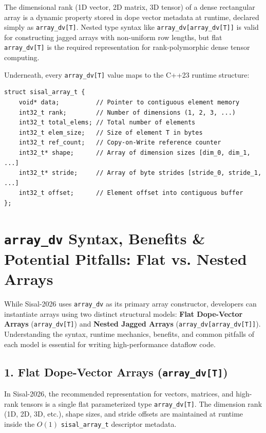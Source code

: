 \begin{note}
The dimensional rank (1D vector, 2D matrix, 3D tensor) of a dense rectangular array is a dynamic property stored in dope vector metadata at runtime, declared simply as \texttt{array\_dv[T]}. Nested type syntax like \texttt{array\_dv[array\_dv[T]]} is valid for constructing jagged arrays with non-uniform row lengths, but flat \texttt{array\_dv[T]} is the required representation for rank-polymorphic dense tensor computing.
\end{note}

Underneath, every \texttt{array\_dv[T]} value maps to the C++23 runtime structure:
\begin{lstlisting}[caption={\texttt{sisal\_array\_t} Dope Vector Structure}]
struct sisal_array_t {
    void* data;          // Pointer to contiguous element memory
    int32_t rank;        // Number of dimensions (1, 2, 3, ...)
    int32_t total_elems; // Total number of elements
    int32_t elem_size;   // Size of element T in bytes
    int32_t ref_count;   // Copy-on-Write reference counter
    int32_t* shape;      // Array of dimension sizes [dim_0, dim_1, ...]
    int32_t* stride;     // Array of byte strides [stride_0, stride_1, ...]
    int32_t offset;      // Element offset into contiguous buffer
};
\end{lstlisting}

\section{\texttt{array\_dv} Syntax, Benefits \& Potential Pitfalls: Flat vs. Nested Arrays}

While Sisal-2026 uses \texttt{array\_dv} as its primary array constructor, developers can instantiate arrays using two distinct structural models: \textbf{Flat Dope-Vector Arrays} (\texttt{array\_dv[T]}) and \textbf{Nested Jagged Arrays} (\texttt{array\_dv[array\_dv[T]]}). Understanding the syntax, runtime mechanics, benefits, and common pitfalls of each model is essential for writing high-performance dataflow code.

\subsection{1. Flat Dope-Vector Arrays (\texttt{array\_dv[T]})}
In Sisal-2026, the recommended representation for vectors, matrices, and high-rank tensors is a single flat parameterized type \texttt{array\_dv[T]}. The dimension rank (1D, 2D, 3D, etc.), shape sizes, and stride offsets are maintained at runtime inside the $O(1)$ \texttt{sisal\_array\_t} descriptor metadata.

